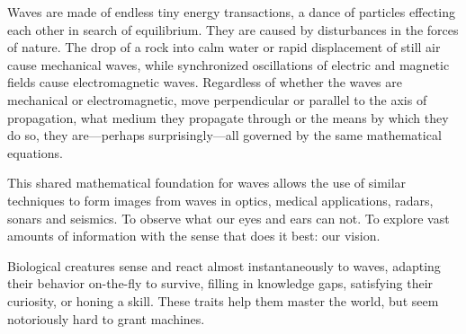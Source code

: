 %
%

Waves are made of endless tiny energy transactions, a dance of particles effecting each other in search of equilibrium. They are caused by disturbances in the forces of nature. The drop of a rock into calm water or rapid displacement of still air cause mechanical waves, while synchronized oscillations of electric and magnetic fields cause electromagnetic waves. Regardless of whether the waves are mechanical or electromagnetic, move perpendicular or parallel to the axis of propagation, what medium they propagate through or the means by which they do so, they are---perhaps surprisingly---all governed by the same mathematical equations.

This shared mathematical foundation for waves allows the use of similar techniques to form images from waves in optics, medical applications, radars, sonars and seismics. To observe what our eyes and ears can not. To explore vast amounts of information with the sense that does it best: our vision.

Biological creatures sense and react almost instantaneously to waves, adapting their behavior on-the-fly to survive, filling in knowledge gaps, satisfying their curiosity, or honing a skill. These traits help them master the world, but seem notoriously hard to grant machines.


%          


